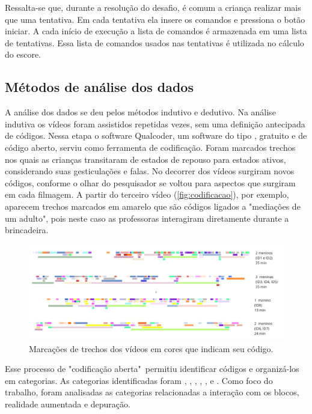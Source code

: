 Ressalta-se que, durante a resolução do desafio, é comum a criança realizar mais que uma tentativa. Em cada tentativa ela insere os comandos e pressiona o botão iniciar. A cada início de execução a lista de comandos é armazenada em uma lista de tentativas. Essa lista de comandos usados nas tentativas é utilizada no cálculo do escore.

\subsection{Métodos de análise dos dados}

A análise dos dados se deu pelos métodos indutivo e dedutivo. Na análise indutiva os vídeos foram assistidos repetidas vezes, sem uma definição antecipada de códigos. Nessa etapa o software  Qualcoder, um software do tipo , gratuito e de código aberto, serviu como ferramenta de codificação. Foram marcados trechos nos quais as crianças transitaram de estados de repouso para estados ativos, considerando suas gesticulações e falas. No decorrer dos vídeos surgiram novos códigos, conforme o olhar do pesquisador se voltou para aspectos que surgiram em cada filmagem. A partir do terceiro vídeo (\autoref{fig:codificacao}), por exemplo, aparecem trechos marcados em amarelo que são códigos ligados a "mediações de um adulto", pois neste caso as professoras interagiram diretamente durante a brincadeira.

\begin{figure}[!htpb]
    \centering
    \includegraphics[width=1\linewidth,fbox]{figs/codificacao_aberta.png}
    \caption{Marcações de trechos dos vídeos em cores que indicam seu código.}
    \sourceauthor
    \label{fig:codificacao}
\end{figure}

Esse processo de "codificação aberta"\ permitiu identificar códigos e organizá-los em categorias. As categorias identificadas foram , , , , ,  e . Como foco do trabalho, foram analisadas as categorias relacionadas a interação com os blocos, realidade aumentada e depuração. 

